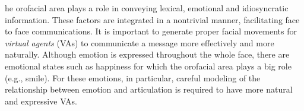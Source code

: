 \documentclass[10pt,journal,compsoc]{IEEEtran}
\begin{document}
\IEEEdisplaynontitleabstractindextext



%



\label{sec:intro}
{he} orofacial area  plays a role in conveying lexical, emotional and idiosyncratic information. These factors  are integrated in a nontrivial manner, facilitating face to face communications. It is important to generate proper facial movements for \emph{virtual agents} (VAs) to communicate a message more effectively and more naturally. Although emotion is expressed throughout the whole face, there are emotional states such as happiness for which the orofacial area plays a big role (e.g., smile). For these emotions, in particular, careful modeling of the relationship between emotion and articulation is required to have more natural and expressive VAs. 
\end{document}
